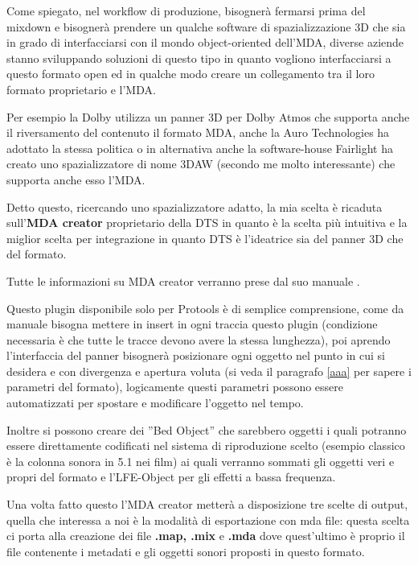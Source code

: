 \documentclass[12pt,a4paper]{report}
\begin{document}
Come spiegato, nel workflow di produzione, bisognerà fermarsi prima del mixdown e bisognerà prendere un qualche software di spazializzazione 3D che sia in grado di interfacciarsi con il mondo object-oriented dell'MDA, diverse aziende stanno sviluppando soluzioni di questo tipo in quanto vogliono interfacciarsi a questo formato open ed in qualche modo creare un collegamento tra il loro formato proprietario e l'MDA.

Per esempio la Dolby utilizza un panner 3D per Dolby Atmos che supporta anche il riversamento del contenuto il formato MDA, anche la Auro Technologies ha adottato la stessa politica o in alternativa anche la software-house Fairlight ha creato uno spazializzatore di nome 3DAW (secondo me molto interessante) che supporta anche esso l'MDA.

Detto questo, ricercando uno spazializzatore adatto, la mia scelta è ricaduta sull'\textbf{MDA creator} proprietario della DTS in quanto è la scelta più intuitiva e la miglior scelta per integrazione in quanto DTS è l'ideatrice sia del panner 3D che del formato.

Tutte le informazioni su MDA creator verranno prese dal suo manuale \cite{creator}.

Questo plugin disponibile solo per Protools è di semplice comprensione, come da manuale bisogna mettere in insert in ogni traccia questo plugin (condizione necessaria è che tutte le tracce devono avere la stessa lunghezza), poi aprendo l'interfaccia del panner bisognerà posizionare ogni oggetto nel punto in cui si desidera e con divergenza e apertura voluta (si veda il paragrafo \ref{aaa} per sapere i parametri del formato), logicamente questi parametri possono essere automatizzati per spostare e modificare l'oggetto nel tempo.

Inoltre si possono creare dei ''Bed Object'' che sarebbero oggetti i quali potranno essere direttamente codificati nel sistema di riproduzione scelto (esempio classico è la colonna sonora in 5.1 nei film) ai quali verranno sommati gli oggetti veri e propri del formato e l'LFE-Object per gli effetti a bassa frequenza.

Una volta fatto questo l'MDA creator metterà a disposizione tre scelte di output, quella che interessa a noi è la modalità di esportazione con mda file: questa scelta ci porta alla creazione dei file \textbf{.map, .mix} e \textbf{.mda} dove quest'ultimo è proprio il file contenente i metadati e gli oggetti sonori proposti in questo formato.
\end{document}
